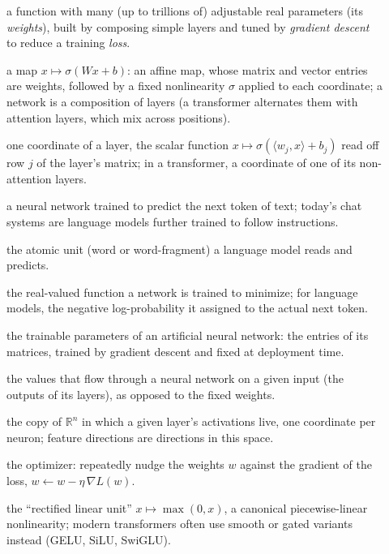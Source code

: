 \begin{description}
\item[] a function with many (up to trillions of) adjustable real parameters (its \emph{weights}), built by composing simple layers and tuned by \emph{gradient descent} to reduce a training \emph{loss}.
\item[] a map $x\mapsto\sigma(Wx+b)$: an affine map, whose matrix and vector entries are weights, followed by a fixed nonlinearity $\sigma$ applied to each coordinate; a network is a composition of layers (a transformer alternates them with attention layers, which mix across positions).
\item[] one coordinate of a layer, the scalar function $x\mapsto\sigma(\langle w_j,x\rangle+b_j)$ read off row $j$ of the layer's matrix; in a transformer, a coordinate of one of its non-attention layers.
\item[] a neural network trained to predict the next token of text; today's chat systems are language models further trained to follow instructions.
\item[] the atomic unit (word or word-fragment) a language model reads and predicts.
\item[] the real-valued function a network is trained to minimize; for language models, the negative log-probability it assigned to the actual next token.
\item[] the trainable parameters of an artificial neural network: the entries of its matrices, trained by gradient descent and fixed at deployment time.
\item[] the values that flow through a neural network on a given input (the outputs of its layers), as opposed to the fixed weights.
\item[] the copy of $\mathbb{R}^n$ in which a given layer's activations live, one coordinate per neuron; feature directions are directions in this space.
\item[] the optimizer: repeatedly nudge the weights $w$ against the gradient of the loss, $w \leftarrow w - \eta\,\nabla L(w)$.
\item[] the ``rectified linear unit'' $x \mapsto \max(0,x)$, a canonical piecewise-linear nonlinearity; modern transformers often use smooth or gated variants instead (GELU, SiLU, SwiGLU).

\end{description}
